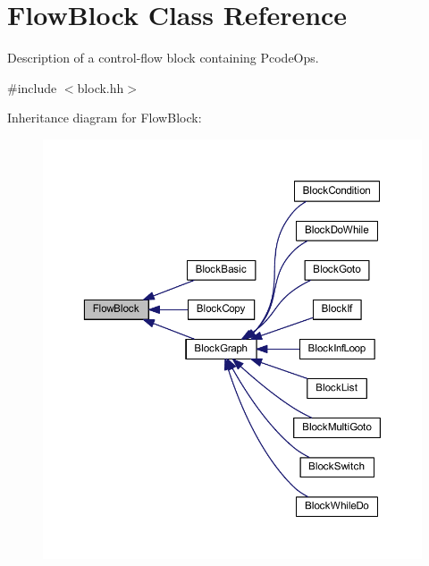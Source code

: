 \hypertarget{class_flow_block}{}\section{Flow\+Block Class Reference}
\label{class_flow_block}


Description of a control-\/flow block containing Pcode\+Ops.  




{\ttfamily \#include $<$block.\+hh$>$}



Inheritance diagram for Flow\+Block\+:
\nopagebreak
\begin{figure}[H]
\begin{center}
\leavevmode
\includegraphics[width=350pt]{class_flow_block__inherit__graph}
\end{center}
\end{figure}
